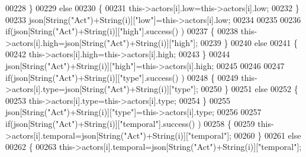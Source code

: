 \begin{DoxyCode}
00228                         \}
00229                         \textcolor{keywordflow}{else}
00230                         \{
00231                             this->actors[i].low=this->actors[i].low;                    
00232                         \}
00233                         json[String(\textcolor{stringliteral}{"Act"})+String(i)][\textcolor{stringliteral}{"low"}]=this->actors[i].low;
00234     
00235                     
00236                         \textcolor{keywordflow}{if}(json[String(\textcolor{stringliteral}{"Act"})+String(i)][\textcolor{stringliteral}{"high"}].success() )
00237                         \{               
00238                             this->actors[i].high=json[String(\textcolor{stringliteral}{"Act"})+String(i)][\textcolor{stringliteral}{"high"}];
00239                         \}
00240                         \textcolor{keywordflow}{else}
00241                         \{
00242                             this->actors[i].high=this->actors[i].high;
00243                         \}
00244                         json[String(\textcolor{stringliteral}{"Act"})+String(i)][\textcolor{stringliteral}{"high"}]=this->actors[i].high;
00245 
00246                     
00247                         \textcolor{keywordflow}{if}(json[String(\textcolor{stringliteral}{"Act"})+String(i)][\textcolor{stringliteral}{"type"}].success() )
00248                         \{               
00249                             this->actors[i].type=json[String(\textcolor{stringliteral}{"Act"})+String(i)][\textcolor{stringliteral}{"type"}]; 
00250                         \}
00251                         \textcolor{keywordflow}{else}
00252                         \{
00253                             this->actors[i].type=this->actors[i].type;
00254                         \}
00255                         json[String(\textcolor{stringliteral}{"Act"})+String(i)][\textcolor{stringliteral}{"type"}]=this->actors[i].type;
00256 
00257                         \textcolor{keywordflow}{if}(json[String(\textcolor{stringliteral}{"Act"})+String(i)][\textcolor{stringliteral}{"temporal"}].success() )
00258                         \{
00259                             this->actors[i].temporal=json[String(\textcolor{stringliteral}{"Act"})+String(i)][\textcolor{stringliteral}{"temporal"}];                                                     
00260                         \}
00261                         \textcolor{keywordflow}{else}
00262                         \{
00263                             this->actors[i].temporal=json[String(\textcolor{stringliteral}{"Act"})+String(i)][\textcolor{stringliteral}{"temporal"}]; 

\end{DoxyCode}
